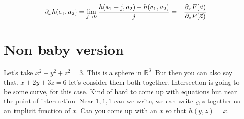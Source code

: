 \documentclass[letter]{article}
\begin{document}
\[
\partial _x h (a_1, a_2) = \lim_{j \to 0} \frac{h(a_1 + j, a_2) - h(a_1, a_2)}{j} = 
-{
	 \partial_x F(\vec{a}) 
	\over
\partial_z F(\vec{a}) }
\]




\section*{Non baby version}
Let's take 
$x^2 + y^2 + z^2 = 3$. This is a sphere
in $\mathbb{R}^{3}$. But then you can also
say that, 
$x + 2y + 3z = 6$
let's consider them both together. Intersection 
is going to be some curve, for this case. Kind of hard
to come up with equations but 
near the point of intersection. Near $1,1,1$ can we write, 
we can write $y,z$ together as an 
implicit function of $x$. 
Can you come up with an $x$ so that $h(y,z) = x$. 
\end{document}
